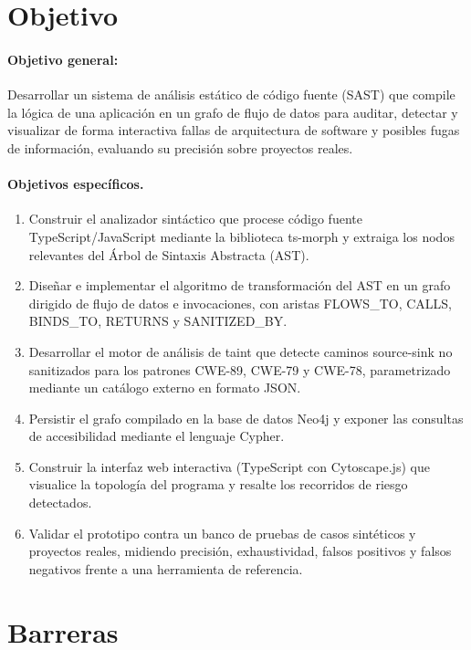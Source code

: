 \section{Objetivo}\label{sec:n1.3}

\paragraph{Objetivo general:} Desarrollar un sistema de análisis estático de código fuente (SAST) que compile la lógica de una aplicación en un grafo de flujo de datos para auditar, detectar y visualizar de forma interactiva fallas de arquitectura de software y posibles fugas de información, evaluando su precisión sobre proyectos reales.

\paragraph{Objetivos específicos.}

\begin{enumerate}[label=OE-\arabic*.,leftmargin=*]
    \item Construir el analizador sintáctico que procese código fuente TypeScript/JavaScript mediante la biblioteca ts-morph y extraiga los nodos relevantes del Árbol de Sintaxis Abstracta (AST).
    \item Diseñar e implementar el algoritmo de transformación del AST en un grafo dirigido de flujo de datos e invocaciones, con aristas FLOWS\_TO, CALLS, BINDS\_TO, RETURNS y SANITIZED\_BY.
    \item Desarrollar el motor de análisis de taint que detecte caminos source-sink no sanitizados para los patrones CWE-89, CWE-79 y CWE-78, parametrizado mediante un catálogo externo en formato JSON.
    \item Persistir el grafo compilado en la base de datos Neo4j y exponer las consultas de accesibilidad mediante el lenguaje Cypher.
    \item Construir la interfaz web interactiva (TypeScript con Cytoscape.js) que visualice la topología del programa y resalte los recorridos de riesgo detectados.
    \item Validar el prototipo contra un banco de pruebas de casos sintéticos y proyectos reales, midiendo precisión, exhaustividad, falsos positivos y falsos negativos frente a una herramienta de referencia.
\end{enumerate}

\section{Barreras}\label{sec:n1.4}

